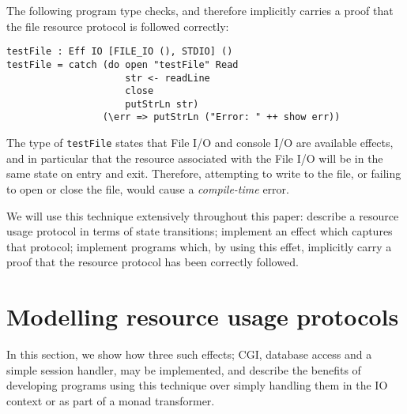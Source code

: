 \documentclass[preprint]{sigplanconf}
\begin{document}
The following program type checks, and therefore implicitly carries 
a proof that the file resource protocol is followed correctly:

\begin{Verbatim}
testFile : Eff IO [FILE_IO (), STDIO] () 
testFile = catch (do open "testFile" Read
                     str <- readLine
                     close
                     putStrLn str)
                 (\err => putStrLn ("Error: " ++ show err))
\end{Verbatim}


The type of \texttt{testFile} states
that File I/O and console I/O are available effects, and in particular that
the resource associated with the File I/O will be in the same state on entry
and exit.
Therefore, attempting to write to the file, or failing to open or close the
file, would cause a \emph{compile-time} error. 

We will use this technique extensively
throughout this paper: describe a resource usage protocol in terms of
state transitions; implement an effect which captures that protocol; implement
programs which, by using this effet, implicitly carry a proof that the resource
protocol has been correctly followed.



\section{Modelling resource usage protocols}
\label{rup}
In this section, we show how three such effects; CGI, database access and a simple session handler, may be implemented, and describe the benefits of developing programs using this technique over simply handling them in the IO context or as part of a monad transformer.

\end{document}
